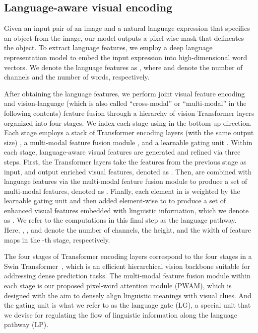 \documentclass[10pt,twocolumn,letterpaper]{article}
\begin{document}
\subsection{Language-aware visual encoding}
\label{sec:lave}
Given an input pair of an image and a natural language expression that specifies an object from the image, our model outputs a pixel-wise mask that delineates the object.
To extract language features, we employ a deep language representation model to embed the input expression into high-dimensional word vectors.
We denote the language features as , where  and  denote the number of channels and the number of words, respectively.

After obtaining the language features, we perform joint visual feature encoding and vision-language (which is also called ``cross-modal'' or ``multi-modal'' in the following contents) feature fusion through a hierarchy of vision Transformer layers organized into four stages. We index each stage using  in the bottom-up direction.
Each stage employs a stack of Transformer encoding layers (with the same output size) , a multi-modal feature fusion module , and a learnable gating unit .
Within each stage, language-aware visual features are generated and refined via three steps.
First, the Transformer layers  take the features from the previous stage as input, and output enriched visual features, denoted as .
Then,  are combined with language features  via the multi-modal feature fusion module  to produce a set of multi-modal features, denoted as .
Finally, each element in  is weighted by the learnable gating unit  and then added element-wise to  to produce a set of enhanced visual features embedded with linguistic information, which we denote as .
We refer to the computations in this final step as the language pathway.
Here, , , and  denote the number of channels, the height, and the width of feature maps in the -th stage, respectively.

The four stages of Transformer encoding layers correspond to the four stages in a Swin Transformer~\cite{Liu_2021_swin}, which is an efficient hierarchical vision backbone suitable for addressing dense prediction tasks.
The multi-modal feature fusion module within each stage is our proposed pixel-word attention module (PWAM), which is designed with the aim to densely align linguistic meanings with visual clues.
And the gating unit is what we refer to as the language gate (LG), a special unit that we devise for regulating the flow of linguistic information along the language pathway (LP).
\end{document}
